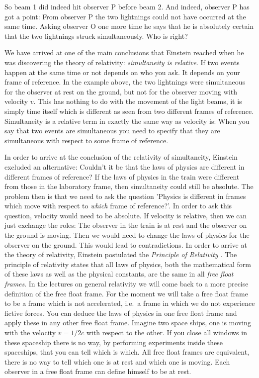 {\begin{multicols}{2}
So beam 1 did indeed hit observer P before beam 2. And indeed, observer P has got a point: From observer P the two lightnings could not have occurred at the same time. Asking observer O one more time he says that he is absolutely certain that the two lightnings struck simultaneously. Who is right?

We have arrived at one of the main conclusions that Einstein reached when he was discovering the theory of relativity: \emph{simultaneity is relative}. If two events happen at the same time or not depends on who you ask. It depends on your frame of reference. In the example above, the two lightnings were simultaneous for the observer at rest on the ground, but not for the observer moving with velocity $v$. This has nothing to do with the movement of the light beams, it is simply time itself which is different as seen from two different frames of reference. Simultaneity is a relative term in exactly the same way as velocity is: When you say that two events are simultaneous you need to specify that they are simultaneous with respect to some frame of reference.

In order to arrive at the conclusion of the relativity of simultaneity, Einstein excluded an alternative: Couldn't it be that the laws of physics are different in different frames of reference? If the laws of physics in the train were different from those in the laboratory frame, then simultaneity could still be absolute. The problem then is that we need to ask the question 'Physics is different in frames which move with respect to {\it which} frame of reference?'. In order to ask this question, velocity would need to be absolute. If velocity is relative, then we can just exchange the roles: The observer in the train is at rest and the observer on the ground is moving. Then we would need to change the laws of physics for the observer on the ground. This would lead to contradictions. In order to arrive at the theory of relativity, Einstein postulated the {\it Principle of Relativity \label{pg:por}}. The principle of relativity states that all laws of physics, both the mathematical form of these laws as well as the physical constants, are the same in all {\it free float frames\label{pg:ff}}. In the lectures on general relativity we will come back to a more precise definition of the free float frame. For the moment we will take a free float frame to be a frame which is not accelerated, i.e.\ a frame in which we do not experience fictive forces. You can deduce the laws of physics in one free float frame and apply these in any other free float frame. Imagine two space ships, one is moving with the velocity $v=1/2c$ with respect to the other. If you close all windows in these spaceship there is no way, by performing experiments inside these spaceships, that you can tell which is which. All free float frames are equivalent, there is no way to tell which one is at rest and which one is moving. Each observer in a free float frame can define himself to be at rest.


\end{multicols}}
